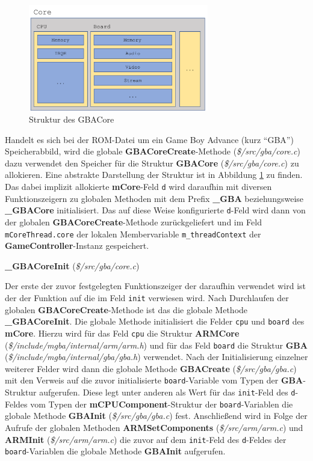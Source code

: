 \documentclass[11pt,a4paper]{scrartcl}
\newcommand{\paratitlecode}[2] {
    \vspace{5mm}
    \large \textbf{#1} \normalsize(\textit{\${#2}})
    \vspace{2mm}\newline
}
\begin{document}
\begin{figure}[h]
    \centering
    \includegraphics[width=0.7\textwidth]{Emulator_Core}
    \caption{Struktur des GBACore}
    \label{fig:mcore}
\end{figure}

Handelt es sich bei der ROM-Datei um ein Game Boy Advance (kurz \enquote{GBA}) Speicherabbild, wird die globale \textbf{GBACoreCreate}-Methode (\textit{\$/src/gba/core.c}) dazu verwendet den Speicher f\"ur die Struktur \textbf{GBACore} (\textit{\$/src/gba/core.c}) zu allokieren. Eine abstrakte Darstellung der Struktur ist in Abbildung \ref{fig:mcore} zu finden. Das dabei implizit allokierte \textbf{mCore}-Feld \verb|d| wird daraufhin mit diversen Funktionszeigern zu globalen Methoden mit dem Prefix \textbf{{\_}GBA} beziehungsweise \textbf{{\_}GBACore} initialisiert. Das auf diese Weise konfigurierte \verb|d|-Feld wird dann von der globalen \textbf{GBACoreCreate}-Methode zur\"uckgeliefert und im Feld \verb|mCoreThread.core| der lokalen Membervariable \verb|m_threadContext| der \textbf{GameController}-Instanz gespeichert.


\paratitlecode{{\_}GBACoreInit}{/src/gba/core.c}
Der erste der zuvor festgelegten Funktionszeiger der daraufhin verwendet wird ist der der Funktion auf die im Feld \verb|init| verwiesen wird. Nach Durchlaufen der globalen \textbf{GBACoreCreate}-Methode ist das die globale Methode \textbf{{\_}GBACoreInit}. Die globale Methode initialisiert die Felder \verb|cpu| und \verb|board| des \textbf{mCore}. Hierzu wird f\"ur das Feld \verb|cpu| die Struktur \textbf{ARMCore} (\textit{\$/include/mgba/internal/arm/arm.h}) und f\"ur das Feld \verb|board| die Struktur \textbf{GBA} (\textit{\$/include/mgba/internal/gba/gba.h}) verwendet. Nach der Initialisierung einzelner weiterer Felder wird dann die globale Methode \textbf{GBACreate} (\textit{\$/src/gba/gba.c}) mit den Verweis auf die zuvor initialisierte \verb|board|-Variable vom Typen der \textbf{GBA}-Struktur aufgerufen. Diese legt unter anderen als Wert f\"ur das \verb|init|-Feld des \verb|d|-Feldes vom Typen der \textbf{mCPUComponent}-Struktur der \verb|board|-Variablen die globale Methode \textbf{GBAInit} (\textit{\$/src/gba/gba.c}) fest. Anschlie{\ss}end wird in Folge der Aufrufe der globalen Methoden \textbf{ARMSetComponents} (\textit{\$/src/arm/arm.c}) und \textbf{ARMInit} (\textit{\$/src/arm/arm.c}) die zuvor auf dem \verb|init|-Feld des \verb|d|-Feldes der \verb|board|-Variablen die globale Methode \textbf{GBAInit} aufgerufen.
\end{document}
